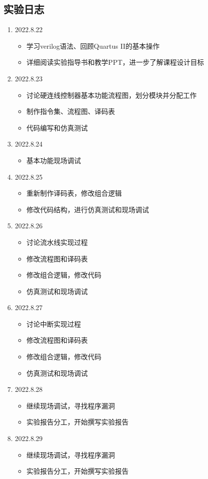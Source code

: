 \subsection{实验日志}
\begin{enumerate}[]
    \item 2022.8.22
    \begin{itemize}
        \item 学习verilog语法、回顾Quartus II的基本操作
        \item 详细阅读实验指导书和教学PPT，进一步了解课程设计目标
    \end{itemize}
    \item 2022.8.23
    \begin{itemize}
        \item 讨论硬连线控制器基本功能流程图，划分模块并分配工作
        \item 制作指令集、流程图、译码表
        \item 代码编写和仿真测试
    \end{itemize}
    \item 2022.8.24
    \begin{itemize}
        \item 基本功能现场调试
    \end{itemize}
    \item 2022.8.25
    \begin{itemize}
        \item 重新制作译码表，修改组合逻辑
        \item 修改代码结构，进行仿真测试和现场调试
    \end{itemize}
    \item 2022.8.26
    \begin{itemize}
        \item 讨论流水线实现过程
        \item 修改流程图和译码表
        \item 修改组合逻辑，修改代码
        \item 仿真测试和现场调试
    \end{itemize}
    \item 2022.8.27
    \begin{itemize}
        \item 讨论中断实现过程
        \item 修改流程图和译码表
        \item 修改组合逻辑，修改代码
        \item 仿真测试和现场调试
    \end{itemize}
    \item 2022.8.28
    \begin{itemize}
        \item 继续现场调试，寻找程序漏洞
        \item 实验报告分工，开始撰写实验报告
    \end{itemize}
    \item 2022.8.29
    \begin{itemize}
        \item 继续现场调试，寻找程序漏洞
        \item 实验报告分工，开始撰写实验报告
    \end{itemize}
\end{enumerate}